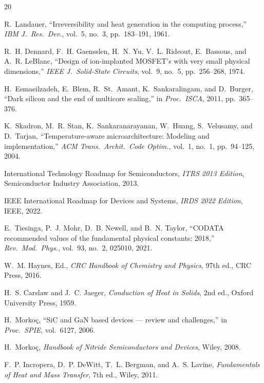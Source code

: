 \documentclass[11pt,twocolumn]{article}
\begin{document}
\begin{thebibliography}{20}

R.~Landauer,
``Irreversibility and heat generation in the computing process,''
\emph{IBM J.\ Res.\ Dev.}, vol.~5, no.~3, pp.~183--191, 1961.

R.~H. Dennard, F.~H. Gaensslen, H.~N. Yu, V.~L. Rideout, E.~Bassous,
and A.~R. LeBlanc,
``Design of ion-implanted MOSFET's with very small physical dimensions,''
\emph{IEEE J.\ Solid-State Circuits}, vol.~9, no.~5, pp.~256--268, 1974.

H.~Esmaeilzadeh, E.~Blem, R.~St.~Amant, K.~Sankaralingam, and
D.~Burger,
``Dark silicon and the end of multicore scaling,''
in \emph{Proc.\ ISCA}, 2011, pp.~365--376.

K.~Skadron, M.~R. Stan, K.~Sankaranarayanan, W.~Huang, S.~Velusamy,
and D.~Tarjan,
``Temperature-aware microarchitecture: Modeling and implementation,''
\emph{ACM Trans.\ Archit.\ Code Optim.}, vol.~1, no.~1, pp.~94--125,
2004.

International Technology Roadmap for Semiconductors,
\emph{ITRS 2013 Edition}, Semiconductor Industry Association, 2013.

IEEE International Roadmap for Devices and Systems,
\emph{IRDS 2022 Edition}, IEEE, 2022.

E.~Tiesinga, P.~J. Mohr, D.~B. Newell, and B.~N. Taylor,
``CODATA recommended values of the fundamental physical constants: 2018,''
\emph{Rev.\ Mod.\ Phys.}, vol.~93, no.~2, 025010, 2021.

W.~M. Haynes, Ed.,
\emph{CRC Handbook of Chemistry and Physics}, 97th ed.,
CRC Press, 2016.

H.~S. Carslaw and J.~C. Jaeger,
\emph{Conduction of Heat in Solids}, 2nd ed.,
Oxford University Press, 1959.

H.~Morko\c{c},
``SiC and GaN based devices --- review and challenges,''
in \emph{Proc.\ SPIE}, vol.~6127, 2006.

H.~Morko\c{c},
\emph{Handbook of Nitride Semiconductors and Devices},
Wiley, 2008.

F.~P. Incropera, D.~P. DeWitt, T.~L. Bergman, and A.~S. Lavine,
\emph{Fundamentals of Heat and Mass Transfer}, 7th ed.,
Wiley, 2011.

\end{thebibliography}
\end{document}
